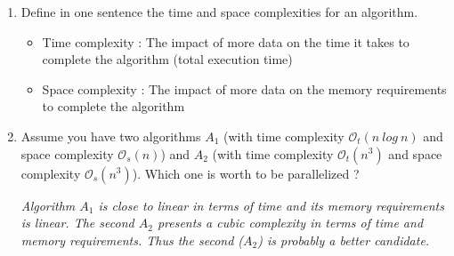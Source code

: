 \documentclass[11pt,a4paper]{article}
\begin{document}


\begin{exercise}
  $~$ %
\begin{enumerate}[label=(\alph*)]
	\item Define in one sentence the time and space complexities for an algorithm.

{\it
	\begin{itemize}
		\item Time complexity : The impact of more data on the time it takes to complete the algorithm (total execution time)
		\item Space complexity : The impact of more data on the memory requirements to complete the algorithm 
	\end{itemize}

}

	\item Assume you have two algorithms $A_1$ (with time complexity $\mathcal{O}_t(n~log~n)$ and space complexity $\mathcal{O}_s(n)$) and $A_2$ (with time complexity $\mathcal{O}_t(n^3)$ and space complexity $\mathcal{O}_s(n^3)$). Which one is worth to be parallelized ?

{\it
	Algorithm $A_1$ is close to linear in terms of time and its memory requirements is linear. The second $A_2$ presents a cubic complexity in terms of time and memory requirements. Thus the second ($A_2$) is probably a better candidate. 
}

\end{enumerate}
\end{exercise}
\end{document}
